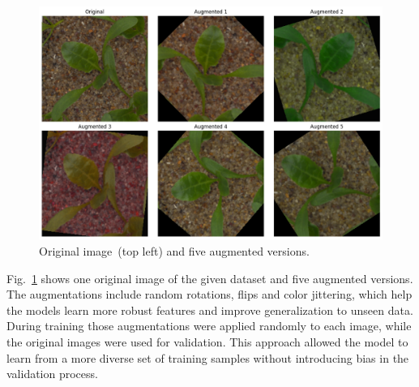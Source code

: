 \begin{figure}[htbp]
    \centerline{\includegraphics[width=0.9\linewidth]{../../resources/data_augmentation.png}}
    \caption{Original image~(top left) and five augmented versions.}
    \label{fig:data-augmentation}
\end{figure}

Fig.~\ref{fig:data-augmentation} shows one original image of the given dataset and five augmented versions. The augmentations include random rotations, flips and color jittering, which help the models learn more robust features and improve generalization to unseen data. During training those augmentations were applied randomly to each image, while the original images were used for validation. This approach allowed the model to learn from a more diverse set of training samples without introducing bias in the validation process.